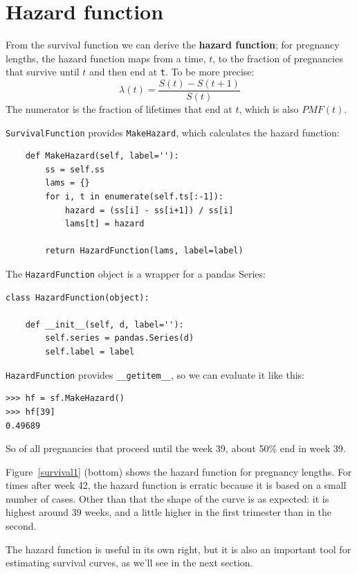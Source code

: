 \documentclass[12pt]{book}
\begin{document}
\section{Hazard function}

From the survival function we can derive the {\bf hazard function};
for pregnancy lengths, the hazard function maps from
a time, $t$, to the
fraction of pregnancies that survive
until $t$ and then end at {\tt t}.  To be more precise:
%
\[ \lambda(t) = \frac{S(t) - S(t+1)}{S(t)} \]
%
The numerator is the fraction of lifetimes that end at $t$, which
is also $PMF(t)$.

{\tt SurvivalFunction} provides {\tt MakeHazard}, which calculates
the hazard function:

\begin{verbatim}
    def MakeHazard(self, label=''):
        ss = self.ss
        lams = {}
        for i, t in enumerate(self.ts[:-1]):
            hazard = (ss[i] - ss[i+1]) / ss[i]
            lams[t] = hazard

        return HazardFunction(lams, label=label)
\end{verbatim}

The {\tt HazardFunction} object is a wrapper for a pandas
Series:

\begin{verbatim}
class HazardFunction(object):

    def __init__(self, d, label=''):
        self.series = pandas.Series(d)
        self.label = label
\end{verbatim}

{\tt HazardFunction} provides \verb"__getitem__", so we can evaluate
it like this:

\begin{verbatim}
>>> hf = sf.MakeHazard()
>>> hf[39]
0.49689
\end{verbatim}

So of all pregnancies that proceed until the week 39, about
50\% end in week 39.

Figure~\ref{survival1} (bottom) shows the hazard function for
pregnancy lengths.  For times after week 42, the hazard function
is erratic because it is based on a small number of cases.
Other than that the shape of the curve is as expected: it is
highest around 39 weeks, and a little higher in the first
trimester than in the second.

The hazard function is useful in its own right, but it is also an
important tool for estimating survival curves, as we'll see in the
next section.
\end{document}

